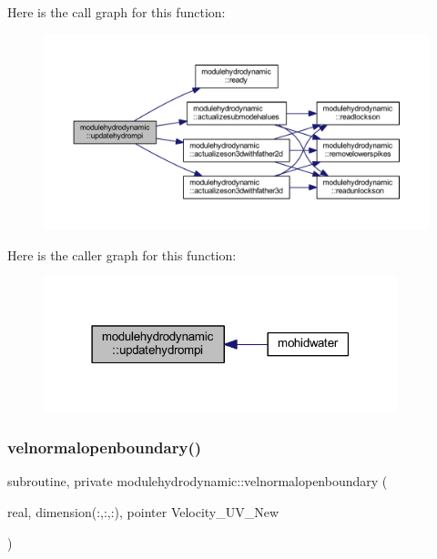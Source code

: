 Here is the call graph for this function\+:\nopagebreak
\begin{figure}[H]
\begin{center}
\leavevmode
\includegraphics[width=350pt]{namespacemodulehydrodynamic_a0b6a544e894ede118ad20bf00d80fa39_cgraph}
\end{center}
\end{figure}
Here is the caller graph for this function\+:\nopagebreak
\begin{figure}[H]
\begin{center}
\leavevmode
\includegraphics[width=291pt]{namespacemodulehydrodynamic_a0b6a544e894ede118ad20bf00d80fa39_icgraph}
\end{center}
\end{figure}
\mbox{\label{namespacemodulehydrodynamic_af23df453cb52dbe604e896aba3b572aa}} 
\subsubsection{\texorpdfstring{velnormalopenboundary()}{velnormalopenboundary()}}
{\footnotesize\ttfamily subroutine, private modulehydrodynamic\+::velnormalopenboundary (\begin{DoxyParamCaption}\item[{real, dimension(\+:,\+:,\+:), pointer}]{Velocity\+\_\+\+U\+V\+\_\+\+New }\end{DoxyParamCaption})\hspace{0.3cm}{\ttfamily [private]}}

